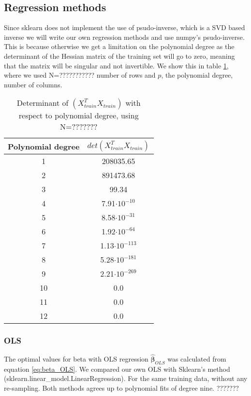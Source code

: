 \subsection{Regression methods}
Since sklearn does not implement the use of psudo-inverse, which is a SVD based inverse we will write our own regression methods and use numpy's psudo-inverse. This is because otherwise we get a limitation on the polynomial degree as the determinant of the Hessian matrix of the training set will go to zero, meaning that the matrix will be singular and not invertible. We show this in table \ref{tab:determinants}, where we used N=??????????? number of rows and $p$, the polynomial degree, number of columns.

\begin{table}
    \centering
    \caption{Determinant of $(X^T_{train}X_{train})$ with respect to polynomial
    degree, using N=???????}
    \begin{tabular}{|c|c|}
        \hline
        Polynomial degree & $det(X_{train}^T X_{train})$  \\
        \hline
        1 & 208035.65\\
        \hline
        2 & 891473.68\\
        \hline
        3 & 99.34\\
        \hline
        4 & 7.91$\cdot10^{-10}$ \\
        \hline
        5 & 8.58$\cdot10^{-31}$ \\
        \hline
        6 & 1.92$\cdot10^{-64}$ \\
        \hline
        7 & 1.13$\cdot10^{-113}$ \\
        \hline
        8 & 5.28$\cdot10^{-181}$ \\
        \hline
        9 & 2.21$\cdot10^{-269}$ \\
        \hline
        10 & 0.0 \\
        \hline
        11 & 0.0 \\
        \hline
        12 & 0.0 \\
        \hline
    \end{tabular}\label{tab:determinants}
\end{table}


\subsubsection{OLS}
The optimal values for beta with OLS regression $\hat{\bm{\beta}  }_{OLS}$ was
calculated from equation
\eqref{eq:beta_OLS}. We compared our own OLS with Sklearn's method
(sklearn.linear\_model.LinearRegression). For the same training data, without
any re-sampling. Both methods agrees up to polynomial fits of degree nine. ???????  

